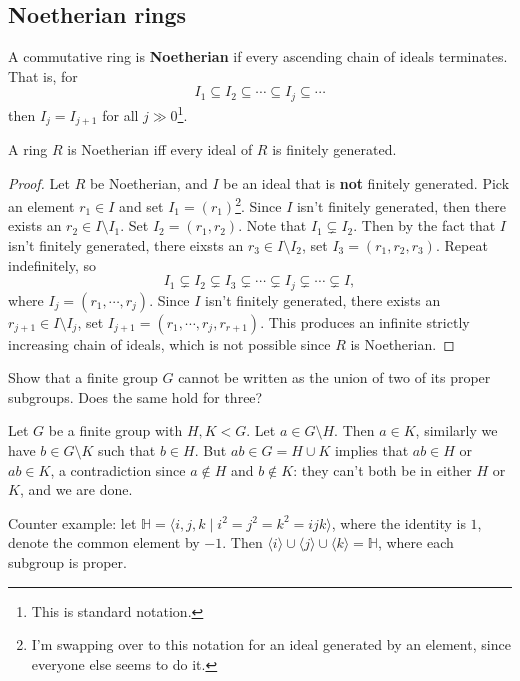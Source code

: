 \subsection{Noetherian rings}
\begin{definition}
   A commutative ring is \textbf{Noetherian} if every ascending chain of ideals terminates. That is, for \[
   I_1 \subseteq I_2\subseteq \cdots \subseteq I_j \subseteq \cdots 
   \] then $I_j =I_{j+1}$ for all $j\gg 0$\footnote{This is standard notation.}.
\end{definition}
\begin{prop}
    A ring $R$ is Noetherian iff every ideal of $R$ is finitely generated.
\end{prop}
\begin{proof}
    Let $R$ be Noetherian, and $I$ be an ideal that is \textbf{not} finitely generated. Pick an element $r_1\in I$ and set $I_1=(r_1)$\footnote{I'm swapping over to this notation for an ideal generated by an element, since everyone else seems to do it.}. Since $I$ isn't finitely generated, then there exists an $r_2\in I \setminus I_1$. Set $I_2=(r_1,r_2)$. Note that $I_1 \subsetneq I_2$. Then by the fact that $I$ isn't finitely generated, there eixsts an $r_3\in I \setminus I_2$, set $I_3=(r_1,r_2,r_3)$. Repeat indefinitely, so \[
    I_1 \subsetneq I_2 \subsetneq I_3 \subsetneq \cdots \subsetneq I_j  \subsetneq \cdots \subsetneq I,
\] where $I_j =(r_1,\cdots,r_j )$. Since $I$ isn't finitely generated, there exists an $r_{j+1}\in I \setminus I_j $, set $I_{j+1}=(r_1,\cdots ,r_j ,r_{r+1})$. This produces an infinite strictly increasing chain of ideals, which is not possible since $R$ is Noetherian.
\end{proof}

\begin{prob}
Show that a finite group $G$ cannot be written as the union of two of its proper subgroups. Does the same hold for three?
\end{prob}
\begin{solution}
    Let $G$ be a finite group with $H,K<G$. Let $a\in G\setminus H$. Then $a\in K$, similarly we have $b\in G\setminus K$ such that $b\in H$. But $ab\in G=H\cup K$ implies that $ab\in H$ or $ab\in K$, a contradiction since $a\notin H$ and $b\notin K$: they can't both be in either $H$ or $K$, and we are done.

    Counter example: let $\mathbb{H}=\langle i,j,k \mid i^2=j^2=k^2=ijk \rangle $, where the identity is $1$, denote the common element by $-1$. Then $\langle i \rangle \cup \langle j \rangle \cup \langle k \rangle =\mathbb{H}$, where each subgroup is proper.
\end{solution}

